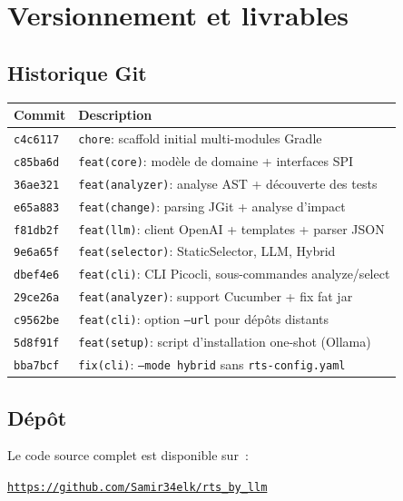 \documentclass[12pt,a4paper]{article}
\begin{document}
\section{Versionnement et livrables}

\subsection{Historique Git}

\begin{tabularx}{\linewidth}{lX}
\toprule
\textbf{Commit} & \textbf{Description} \\
\midrule
\texttt{c4c6117} & \texttt{chore}: scaffold initial multi-modules Gradle \\
\texttt{c85ba6d} & \texttt{feat(core)}: modèle de domaine + interfaces SPI \\
\texttt{36ae321} & \texttt{feat(analyzer)}: analyse AST + découverte des tests \\
\texttt{e65a883} & \texttt{feat(change)}: parsing JGit + analyse d'impact \\
\texttt{f81db2f} & \texttt{feat(llm)}: client OpenAI + templates + parser JSON \\
\texttt{9e6a65f} & \texttt{feat(selector)}: StaticSelector, LLM, Hybrid \\
\texttt{dbef4e6} & \texttt{feat(cli)}: CLI Picocli, sous-commandes analyze/select \\
\texttt{29ce26a} & \texttt{feat(analyzer)}: support Cucumber + fix fat jar \\
\texttt{c9562be} & \texttt{feat(cli)}: option \texttt{--url} pour dépôts distants \\
\texttt{5d8f91f} & \texttt{feat(setup)}: script d'installation one-shot (Ollama) \\
\texttt{bba7bcf} & \texttt{fix(cli)}: \texttt{--mode hybrid} sans \texttt{rts-config.yaml} \\
\bottomrule
\end{tabularx}

\subsection{Dépôt}

Le code source complet est disponible sur~:
\begin{center}
\texttt{\href{https://github.com/Samir34elk/rts_by_llm}{https://github.com/Samir34elk/rts\_by\_llm}}
\end{center}
\end{document}
